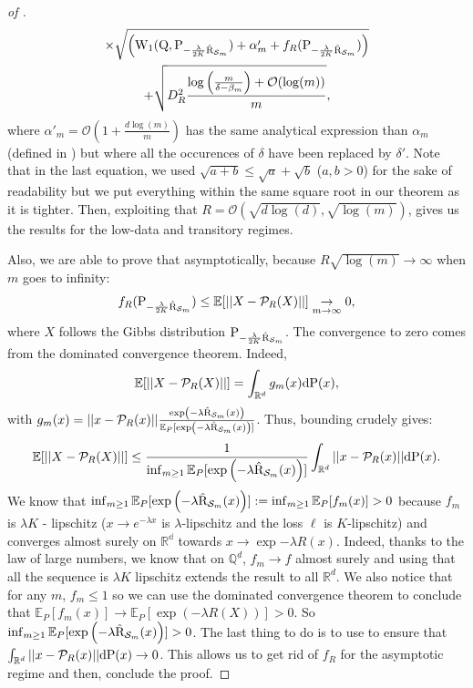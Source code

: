 \begin{proof}[of ]
\begin{multline}
\times\sqrt{\left(\W_{1}( \Q, \P_{-\frac{\lambda}{2K} \Riskhat_{\Sm}})+\alpha'_m + f_R(\P_{-\frac{\lambda}{2K} \Riskhat_{\Sm}}) \right)} \\
+\sqrt{ D_R^2\frac{\log\left( \frac{m}{\delta-\beta_m} \right) +\mathcal{O}(\log(m)) }{m}},
\end{multline}
where $\alpha'_m= \mathcal{O}(1+ \frac{d\log(m)}{m})$ has the same analytical expression than $\alpha_m$ (defined in ) but where all the occurences of $\delta$ have been replaced by $\delta'$.
Note that in the last equation, we used $\sqrt{a+b} \leq \sqrt{a} + \sqrt{b}$ ($a,b>0$) for the sake of readability but we put everything within the same square root in our theorem as it is tighter.
Then, exploiting that $R= \mathcal{O}(\sqrt{d\log (d)}, \sqrt{\log(m)})$, gives us the results for the low-data and transitory regimes.
\medskip

\noindent Also, we are able to prove that asymptotically, because $R \sqrt{\log(m)}\rightarrow \infty$ when $m$ goes to infinity:
$$f_R(\P_{-\frac{\lambda}{2K} \Riskhat_{\Sm}}) \leq \mathbb{E}[||X-\mathcal{P}_{R}(X)||] \underset{m\rightarrow \infty}{\rightarrow} 0,    $$
where $X$ follows the Gibbs distribution $\P_{-\frac{\lambda}{2K} \Riskhat_{\Sm}}$. The convergence to zero comes from the dominated convergence theorem.
Indeed,
\[ \mathbb{E}[||X-\mathcal{P}_{R}(X)||] = \int_{\mathbb{R}^d} g_m(x) \mathrm{d}\P(x), \]
with $g_m(x)= ||x - \mathcal{P}_{R}(x)||\frac{\exp\left(-\lambda \Riskhat_{\Sm}(x) \right)}{\mathbb{E}_P[\exp\left(-\lambda \Riskhat_{\Sm}(x) \right)]}$. Thus, bounding crudely gives:
\[  \mathbb{E}[||X-\mathcal{P}_{R}(X)||] \leq \frac{1}{\inf_{m\geq 1} \mathbb{E}_P[\exp\left(-\lambda \Riskhat_{\Sm}(x) \right)]} \int_{\mathbb{R}^d} ||x - \mathcal{P}_{R}(x)|| \mathrm{d}\P(x).\]
We know that $\inf_{m\geq 1} \mathbb{E}_P[\exp\left(-\lambda \Riskhat_{\Sm}(x) \right)] := \inf_{m\geq 1} \mathbb{E}_P[f_m(x) ] >0$ because $f_m$ is $\lambda K$ - lipschitz ($x \rightarrow e^{- \lambda x}$ is $\lambda$-lipschitz and the loss $\ell$ is $K$-lipschitz)
and converges almost surely on $\mathbb{R^d}$ towards $x\rightarrow \exp{-\lambda R(x)}$. Indeed, thanks to the law of large numbers, we know that on $\mathbb{Q}^d$, $f_m \rightarrow f$ almost surely and using that all the sequence is $\lambda K$ lipschitz extends the result to all $\mathbb{R}^d$.
We also notice that for any $m$, $f_m \leq 1$ so we can use the dominated convergence theorem to conclude that $\mathbb{E}_P[f_m(x)] \rightarrow  \mathbb{E}_P[\exp(-\lambda R(X)) ] >0.$ So $\inf_{m\geq 1} \mathbb{E}_P[\exp\left(-\lambda \Riskhat_{\Sm}(x) \right)]>0$.
The last thing to do is to use  to ensure that $\int_{\mathbb{R}^d} ||x - \mathcal{P}_{R}(x)|| \mathrm{d}\P(x) \rightarrow 0$.
This allows us to get rid of $f_R$ for the asymptotic regime and then, conclude the proof.
\end{proof}



